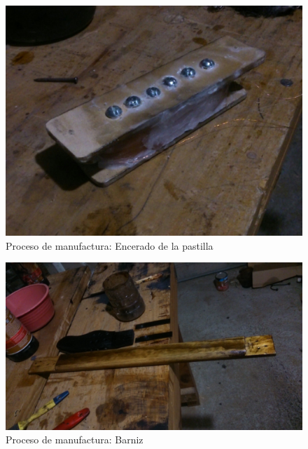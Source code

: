 \begin{figure}[!htbp]
\caption{Proceso de manufactura: Encerado de la pastilla}
\centering
\includegraphics [scale=0.1]{./img/DSC_0003.JPG}
\end{figure}

\begin{figure}[!htbp]
\caption{Proceso de manufactura: Barniz}
\centering
\includegraphics [scale=0.1]{./img/DSC_0004.JPG}
\end{figure}

